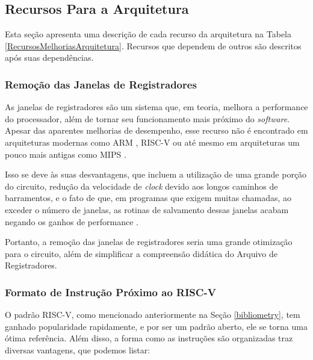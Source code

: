\documentclass[
	12pt,				%
	openright,			%
	oneside,			%
	a4paper,			%
	english,			%
	french,				%
	spanish,			%
	brazil,				%
	]{abntex2}
\begin{document}
\subsection{Recursos Para a Arquitetura}
Esta seção apresenta uma descrição de cada recurso da arquitetura na Tabela \ref{RecursosMelhoriasArquitetura}. Recursos que dependem de outros são descritos após suas dependências.

\subsubsection{Remoção das Janelas de Registradores}\label{recursos_remocao}%
As janelas de registradores são um sistema que, em teoria, melhora a performance do processador, além de tornar seu funcionamento mais próximo do \textit{software}. Apesar das aparentes melhorias de desempenho, esse recurso não é encontrado em arquiteturas modernas como ARM \cite{arm_arm_2014}, RISC-V \cite{risc-v_risc-v_2024} ou até mesmo em arquiteturas um pouco mais antigas como MIPS \cite{mips_tech_llc_mips32_2016}.

Isso se deve às suas desvantagens, que incluem a utilização de uma grande porção do circuito, redução da velocidade de \textit{clock} devido aos longos caminhos de barramentos, e o fato de que, em programas que exigem muitas chamadas, ao exceder o número de janelas, as rotinas de salvamento dessas janelas acabam negando os ganhos de performance \cite{patterson_reduced_1985}.

Portanto, a remoção das janelas de registradores seria uma grande otimização para o circuito, além de simplificar a compreensão didática do Arquivo de Registradores.

\subsubsection{Formato de Instrução Próximo ao RISC-V}\label{recursos_risc-v}%
O padrão RISC-V, como mencionado anteriormente na Seção \ref{bibliometry}, tem ganhado popularidade rapidamente, e por ser um padrão aberto, ele se torna uma ótima referência. Além disso, a forma como as instruções são organizadas traz diversas vantagens, que podemos listar:
\end{document}
